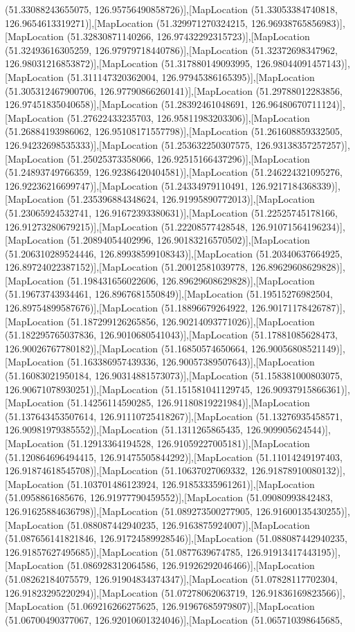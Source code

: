 (51.33088243655075, 126.95756490858726)],[MapLocation (51.33053384740818, 126.9654613319271)],[MapLocation (51.329971270324215, 126.96938765856983)],[MapLocation (51.32830871140266, 126.97432292315723)],[MapLocation (51.32493616305259, 126.97979718440786)],[MapLocation (51.32372698347962, 126.98031216853872)],[MapLocation (51.317880149093995, 126.98044091457143)],[MapLocation (51.311147320362004, 126.97945386165395)],[MapLocation (51.305312467900706, 126.97790866260141)],[MapLocation (51.29788012283856, 126.97451835040658)],[MapLocation (51.28392461048691, 126.96480670711124)],[MapLocation (51.27622433235703, 126.95811983203306)],[MapLocation (51.26884193986062, 126.95108171557798)],[MapLocation (51.261608859332505, 126.94232698535333)],[MapLocation (51.253632250307575, 126.93138357257257)],[MapLocation (51.25025373358066, 126.92515166437296)],[MapLocation (51.24893749766359, 126.92386420404581)],[MapLocation (51.246224321095276, 126.92236216699747)],[MapLocation (51.24334979110491, 126.9217184368339)],[MapLocation (51.235396884348624, 126.91995890772013)],[MapLocation (51.23065924532741, 126.91672393380631)],[MapLocation (51.22525745178166, 126.91273280679215)],[MapLocation (51.22208577428548, 126.91071564196234)],[MapLocation (51.20894054402996, 126.90183216570502)],[MapLocation (51.206310289524446, 126.89938599108343)],[MapLocation (51.20340637664925, 126.89724022387152)],[MapLocation (51.20012581039778, 126.89629608629828)],[MapLocation (51.198431656022606, 126.89629608629828)],[MapLocation (51.19673743934461, 126.8967681550849)],[MapLocation (51.19515276982504, 126.89754899587676)],[MapLocation (51.18896679264922, 126.90171178426787)],[MapLocation (51.187299126265856, 126.90214093771026)],[MapLocation (51.182295765037836, 126.9010680541043)],[MapLocation (51.17881085628473, 126.90026767780182)],[MapLocation (51.16850574650664, 126.90056808521149)],[MapLocation (51.163386957439336, 126.90057389507643)],[MapLocation (51.16083021950184, 126.90314881573073)],[MapLocation (51.158381000803075, 126.90671078930251)],[MapLocation (51.151581041129745, 126.90937915866361)],[MapLocation (51.14256114590285, 126.91180819221984)],[MapLocation (51.137643453507614, 126.91110725418267)],[MapLocation (51.13276935458571, 126.90981979385552)],[MapLocation (51.1311265865435, 126.909905624544)],[MapLocation (51.12913364194528, 126.91059227005181)],[MapLocation (51.120864696494415, 126.91475505844292)],[MapLocation (51.11014249197403, 126.91874618545708)],[MapLocation (51.10637027069332, 126.91878910080132)],[MapLocation (51.103701486123924, 126.91853335961261)],[MapLocation (51.0958861685676, 126.91977790459552)],[MapLocation (51.09080993842483, 126.91625884636798)],[MapLocation (51.089273500277905, 126.91600135430255)],[MapLocation (51.088087442940235, 126.9163875924007)],[MapLocation (51.087656141821846, 126.91724589928546)],[MapLocation (51.088087442940235, 126.91857627495685)],[MapLocation (51.0877639674785, 126.91913417443195)],[MapLocation (51.086928312064586, 126.91926292046466)],[MapLocation (51.08262184075579, 126.91904834374347)],[MapLocation (51.07828117702304, 126.91823295220294)],[MapLocation (51.07278062063719, 126.91836169823566)],[MapLocation (51.069216266275625, 126.91967685979807)],[MapLocation (51.06700490377067, 126.92010601324046)],[MapLocation (51.065710398645685, 